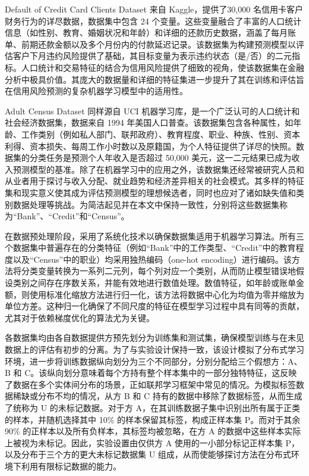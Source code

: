 Default of Credit Card Clients Dataset 来自 Kaggle，提供了30,000 名信用卡客户财务行为的详尽数据，数据集中包含 24 个变量。这些变量融合了丰富的人口统计信息（如性别、教育、婚姻状况和年龄）和详细的还款历史数据，涵盖了每月账单、前期还款金额以及多个月份内的付款延迟记录。该数据集为构建预测模型以评估客户下月违约风险提供了基础，其目标变量为表示违约状态（是/否）的二元指标。人口统计和交易特征的结合为信用风险提供了细致的视角，使该数据集在金融分析中极具价值。其庞大的数据量和详细的特征集进一步提升了其在训练和评估旨在信用风险预测的复杂机器学习模型中的适用性。

Adult Census Dataset 同样源自 UCI 机器学习库，是一个广泛认可的人口统计和社会经济数据集，数据来自 1994 年美国人口普查。该数据集包含各种属性，如年龄、工作类别（例如私人部门、联邦政府）、教育程度、职业、种族、性别、资本利得、资本损失、每周工作小时数以及原籍国，为个人特征提供了详尽的快照。数据集的分类任务是预测个人年收入是否超过 50,000 美元，这一二元结果已成为收入预测模型的基准。除了在机器学习中的应用之外，该数据集还经常被研究人员和从业者用于探讨与收入分配、就业趋势和经济差异相关的社会模式。其多样的特征集和现实意义使其成为评估预测模型的理想候选者，同时也应对了诸如缺失值和类别数据处理等挑战。为简洁起见并在本文中保持一致性，分别将这些数据集称为“Bank”、“Credit”和“Census”。

在数据预处理阶段，采用了系统化技术以确保数据集适用于机器学习算法。所有三个数据集中普遍存在的分类特征（例如“Bank”中的工作类型、“Credit”中的教育程度以及“Census”中的职业）均采用独热编码（one-hot encoding）进行编码。该方法将分类变量转换为一系列二元列，每个列对应一个类别，从而防止模型错误地假设类别之间存在序数关系，并能有效地进行数值处理。数值特征，如年龄或账单金额，则使用标准化缩放方法进行归一化，该方法将数据中心化为均值为零并缩放为单位方差。这种归一化确保了不同尺度的特征在模型学习过程中具有同等的贡献，尤其对于依赖梯度优化的算法尤为关键。

各数据集均由各自数据提供方预先划分为训练集和测试集，确保模型训练与在未见数据上的评估有初步的分离。为了与实验设计保持一致，该设计模拟了分布式学习环境，进一步将训练数据纵向划分为三个不同部分，分别分配给三个假想方：A、B 和 C。该纵向划分意味着每个方持有整个样本集中的一部分独特特征，这反映了数据在多个实体间分布的场景，正如联邦学习框架中常见的情况。为模拟标签数据稀缺或分布不均的情况，从方 B 和 C 持有的数据中移除了数据标签，从而生成了统称为 U 的未标记数据。对于方 A，在其训练数据子集中识别出所有属于正类的样本，并随机选择其中 10\% 的样本保留其标签，构成正样本集 P。而对于其余 90\% 的正样本以及所有负样本，其标签均被忽略，在方 A 的数据中这些样本实际上被视为未标记。因此，实验设置由仅供方 A 使用的一小部分标记正样本集 P，以及分布于三个方的更大未标记数据集 U 组成，从而使能够探讨方法在分布式环境下利用有限标记数据的能力。
